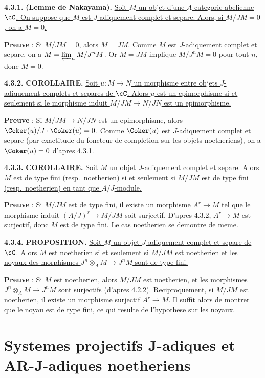 \medskip
\noindent\textbf{4.3.1.} \textbf{(Lemme de Nakayama).} \underline{Soit $M$ un objet d'une $A$-categorie abelienne $\cC$. On suppose que $M$ est $J$-adiquement complet et separe. Alors, si $M/JM = 0$, on a $M = 0$.}

\textbf{Preuve} : Si $M/JM = 0$, alors $M = JM$. Comme $M$ est $J$-adiquement complet et separe, on a $M = \varprojlim_n M/J^n M$. Or $M = JM$ implique $M/J^n M = 0$ pour tout $n$, donc $M = 0$.

\medskip
\noindent\textbf{4.3.2.} \textbf{COROLLAIRE.} \underline{Soit $u : M \longrightarrow N$ un morphisme entre objets $J$-adiquement complets et separes de $\cC$. Alors $u$ est un epimorphisme si et seulement si le morphisme induit $M/JM \longrightarrow N/JN$ est un epimorphisme.}

\textbf{Preuve} : Si $M/JM \longrightarrow N/JN$ est un epimorphisme, alors $\Coker(u)/J \cdot \Coker(u) = 0$. Comme $\Coker(u)$ est $J$-adiquement complet et separe (par exactitude du foncteur de completion sur les objets noetheriens), on a $\Coker(u) = 0$ d'apres 4.3.1.

\medskip
\noindent\textbf{4.3.3.} \textbf{COROLLAIRE.} \underline{Soit $M$ un objet $J$-adiquement complet et separe. Alors $M$ est de type fini (resp.\ noetherien) si et seulement si $M/JM$ est de type fini (resp.\ noetherien) en tant que $A/J$-module.}

\textbf{Preuve} : Si $M/JM$ est de type fini, il existe un morphisme $A^r \longrightarrow M$ tel que le morphisme induit $(A/J)^r \longrightarrow M/JM$ soit surjectif. D'apres 4.3.2, $A^r \longrightarrow M$ est surjectif, donc $M$ est de type fini. Le cas noetherien se demontre de meme.

\medskip
\noindent\textbf{4.3.4.} \textbf{PROPOSITION.} \underline{Soit $M$ un objet $J$-adiquement complet et separe de $\cC$. Alors $M$ est noetherien si et seulement si $M/JM$ est noetherien et les noyaux des morphismes $J^n \otimes_A M \longrightarrow J^n M$ sont de type fini.}

\textbf{Preuve} : Si $M$ est noetherien, alors $M/JM$ est noetherien, et les morphismes $J^n \otimes_A M \longrightarrow J^n M$ sont surjectifs (d'apres 4.2.2). Reciproquement, si $M/JM$ est noetherien, il existe un morphisme surjectif $A^r \longrightarrow M$. Il suffit alors de montrer que le noyau est de type fini, ce qui resulte de l'hypothese sur les noyaux.

\section{Systemes projectifs J-adiques et AR-J-adiques noetheriens}

